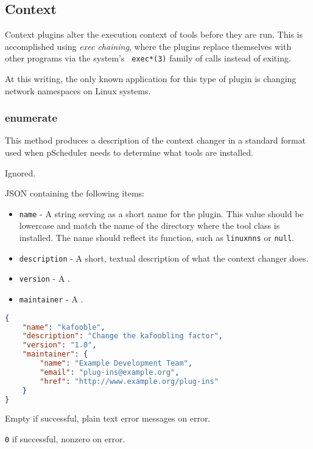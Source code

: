 \documentclass[10pt,titlepage]{article}
\begin{document}
\subsection{Context}

Context plugins alter the execution context of tools before they are
run.  This is accomplished using {\it exec chaining}, where the
plugins replace themselves with other programs via the system's {\tt
  exec*(3)} family of calls instead of exiting.

At this writing, the only known application for this type of
plugin is changing network namespaces on Linux systems.

\subsubsection{enumerate}

This method produces a description of the context changer in a
standard format used when pScheduler needs to determine what tools are
installed.

 Ignored.

 JSON containing the following items:
\begin{itemize}
\item{\tt name} - A string serving as a short name for the plugin.
  This value should be lowercase and match the name of the directory
  where the tool class is installed.  The name should reflect its
  function, such as {\tt linuxnns} or {\tt null}.
\item{\tt description} - A short, textual description of what the
  context changer does.
\item{\tt version} - A .
\item{\tt maintainer} - A .
\end{itemize}

\example
\begin{lstlisting}[language=json,firstnumber=1]
{
    "name": "kafooble",
    "description": "Change the kafoobling factor",
    "version": "1.0",
    "maintainer": {
        "name": "Example Development Team",
        "email": "plug-ins@example.org",
        "href": "http://www.example.org/plug-ins"
    }
}
\end{lstlisting}

 Empty if successful, plain text error
messages on error.

 {\tt 0} if successful, nonzero on error.
\end{document}
